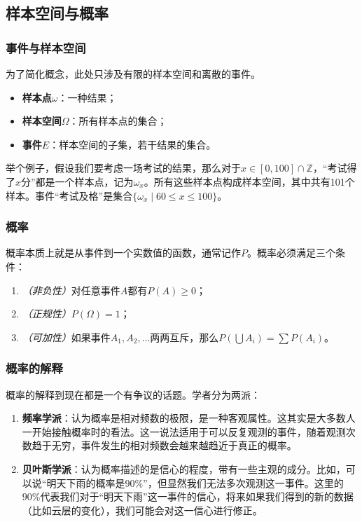\documentclass[9pt,dvipsnames]{beamer}
\begin{document}
\subsection{样本空间与概率}
\begin{frame}
	\frametitle{事件与样本空间}
	为了简化概念，此处只涉及有限的样本空间和离散的事件。
	\begin{itemize}
		\item \textbf{样本点}$\omega$：一种结果；
		\item \textbf{样本空间}$\Omega$：所有样本点的集合；
		\item \textbf{事件}$E$：样本空间的子集，若干结果的集合。
	\end{itemize}

	举个例子，假设我们要考虑一场考试的结果，那么对于$x\in[0, 100]\cap\mathbb{Z}$，``考试得了$x$分''都是一个样本点，记为$\omega_x$。所有这些样本点构成样本空间，其中共有101个样本。事件``考试及格''是集合$\{\omega_x\mid 60\leq x\leq 100\}$。
\end{frame}
\begin{frame}
	\frametitle{概率}
	概率本质上就是从事件到一个实数值的函数，通常记作$P$。概率必须满足三个条件：
	\begin{enumerate}
		\item \textit{（非负性）}对任意事件$A$都有$P(A)\geq 0$；
		\item \textit{（正规性）}$P(\Omega)=1$；
		\item \textit{（可加性）}如果事件$A_1,A_2,\ldots$两两互斥，那么$P(\bigcup A_i)=\sum P(A_i)$。
	\end{enumerate}
\end{frame}
\begin{frame}
	\frametitle{概率的解释}
	概率的解释到现在都是一个有争议的话题。学者分为两派：
	\begin{enumerate}
		\item \textbf{频率学派}：认为概率是相对频数的极限，是一种客观属性。这其实是大多数人一开始接触概率时的看法。这一说法适用于可以反复观测的事件，随着观测次数趋于无穷，事件发生的相对频数会越来越趋近于真正的概率。
		\item \textbf{贝叶斯学派}：认为概率描述的是信心的程度，带有一些主观的成分。比如，可以说``明天下雨的概率是$90\%$''，但显然我们无法多次观测这一事件。这里的$90\%$代表我们对于``明天下雨''这一事件的信心，将来如果我们得到的新的数据（比如云层的变化），我们可能会对这一信心进行修正。
	\end{enumerate}
\end{frame}
\end{document}
